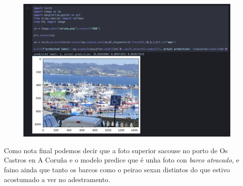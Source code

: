 \documentclass{article}
\begin{document}
\begin{figure}[H]
	\centering
	\includegraphics[width=0.8\linewidth]{ejecucion.png}
\end{figure}

Como nota final podemos decir que a foto superior sacouse no porto de Os Castros en A Coruña e o modelo predice que é unha foto con \emph{barco atracado}, e faino ainda que tanto os barcos como o peirao sexan distintos do que estivo acostumado a ver no adestramento.

\newpage



\end{document}
